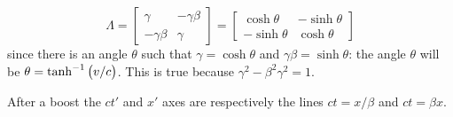 \documentclass[main.tex]{subfiles}
\begin{document}
\begin{equation}
  \Lambda = \begin{bmatrix}
    \gamma & -\gamma \beta \\
    -\gamma \beta & \gamma
  \end{bmatrix}
  = \begin{bmatrix}
  \cosh \theta & -\sinh \theta \\
    -\sinh \theta &  \cosh \theta
  \end{bmatrix}
\end{equation}
%
since there is an angle \(\theta\) such that \(\gamma = \cosh \theta\) and \(\gamma \beta = \sinh \theta\): the angle \(\theta\) will be \(\theta = \tanh^{-1} \qty(v/c)\). This is true because \(\gamma^2 - \beta^2 \gamma^2 = 1\).

After a boost the \(ct'\) and \(x'\) axes are respectively the lines \(ct=x/\beta\) and \(ct = \beta x\).  
\end{document}
